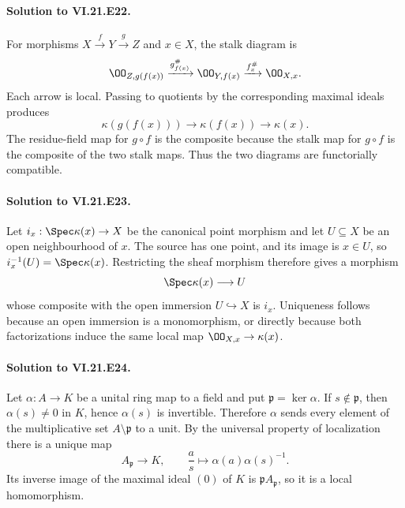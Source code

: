 \paragraph{Solution to VI.21.E22.}
\begin{solution}
For morphisms $X\xrightarrow{f}Y\xrightarrow{g}Z$ and $x\in X$, the stalk diagram is
\[
\OO_{Z,g(f(x))}\xrightarrow{g_{f(x)}^\#}
\OO_{Y,f(x)}\xrightarrow{f_x^\#}\OO_{X,x}.
\]
Each arrow is local.  Passing to quotients by the corresponding maximal ideals produces
\[
\kappa(g(f(x)))\longrightarrow\kappa(f(x))\longrightarrow\kappa(x).
\]
The residue-field map for $g\circ f$ is the composite because the stalk map for $g\circ f$ is the
composite of the two stalk maps.  Thus the two diagrams are functorially compatible.
\end{solution}

\paragraph{Solution to VI.21.E23.}
\begin{solution}
Let $i_x:\Spec\kappa(x)\to X$ be the canonical point morphism and let $U\subseteq X$ be
an open neighbourhood of $x$.  The source has one point, and its image is $x\in U$, so
$i_x^{-1}(U)=\Spec\kappa(x)$.  Restricting the sheaf morphism therefore gives a morphism
\[
\Spec\kappa(x)\longrightarrow U
\]
whose composite with the open immersion $U\hookrightarrow X$ is $i_x$.  Uniqueness follows because
an open immersion is a monomorphism, or directly because both factorizations induce the same local
map $\OO_{X,x}\to\kappa(x)$.
\end{solution}

\paragraph{Solution to VI.21.E24.}
\begin{solution}
Let $\alpha:A\to K$ be a unital ring map to a field and put
$\mathfrak p=\ker\alpha$.  If $s\notin\mathfrak p$, then $\alpha(s)\neq0$ in $K$, hence
$\alpha(s)$ is invertible.  Therefore $\alpha$ sends every element of the multiplicative set
$A\setminus\mathfrak p$ to a unit.  By the universal property of localization there is a unique map
\[
A_{\mathfrak p}\longrightarrow K,\qquad
\frac a s\longmapsto\alpha(a)\alpha(s)^{-1}.
\]
Its inverse image of the maximal ideal $(0)$ of $K$ is $\mathfrak pA_{\mathfrak p}$, so it is a
local homomorphism.
\end{solution}

